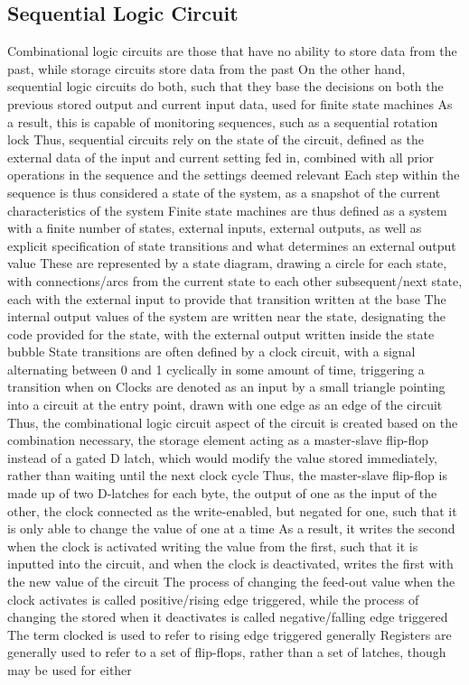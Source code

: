 \documentclass[11 pt, twoside]{article}
\newenvironment{outline*}
{
	\begin{outline}[enumerate]
	}
	{\end{outline}
}
\begin{document}
\subsection{Sequential Logic Circuit}
\begin{outline*}
\1 Combinational logic circuits are those that have no ability to store data from the past, while storage circuits store data from the past
\2 On the other hand, sequential logic circuits do both, such that they base the decisions on both the previous stored output and current input data, used for finite state machines 
\2 As a result, this is capable of monitoring sequences, such as a sequential rotation lock
\1 Thus, sequential circuits rely on the state of the circuit, defined as the external data of the input and current setting fed in, combined with all prior operations in the sequence and the settings deemed relevant 
\2 Each step within the sequence is thus considered a state of the system, as a snapshot of the current characteristics of the system
\2 Finite state machines are thus defined as a system with a finite number of states, external inputs, external outputs, as well as explicit specification of state transitions and what determines an external output value
\3 These are represented by a state diagram, drawing a circle for each state, with connections/arcs from the current state to each other subsequent/next state, each with the external input to provide that transition written at the base
\3 The internal output values of the system are written near the state, designating the code provided for the state, with the external output written inside the state bubble
\1 State transitions are often defined by a clock circuit, with a signal alternating between 0 and 1 cyclically in some amount of time, triggering a transition when on
\2 Clocks are denoted as an input by a small triangle pointing into a circuit at the entry point, drawn with one edge as an edge of the circuit
\1 Thus, the combinational logic circuit aspect of the circuit is created based on the combination necessary, the storage element acting as a master-slave flip-flop instead of a gated D latch, which would modify the value stored immediately, rather than waiting until the next clock cycle
\2 Thus, the master-slave flip-flop is made up of two D-latches for each byte, the output of one as the input of the other, the clock connected as the write-enabled, but negated for one, such that it is only able to change the value of one at a time
\2 As a result, it writes the second when the clock is activated writing the value from the first, such that it is inputted into the circuit, and when the clock is deactivated, writes the first with the new value of the circuit
\3 The process of changing the feed-out value when the clock activates is called positive/rising edge triggered, while the process of changing the stored when it deactivates is called negative/falling edge triggered
\3 The term clocked is used to refer to rising edge triggered generally
\2 Registers are generally used to refer to a set of flip-flops, rather than a set of latches, though may be used for either
\end{outline*}
\end{document}
